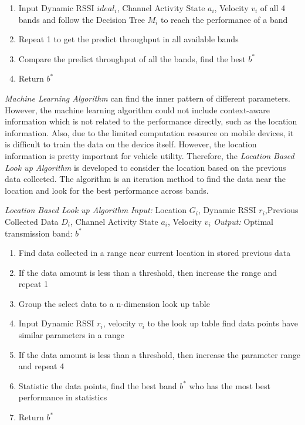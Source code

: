 \begin{enumerate}
\item Input Dynamic RSSI $ideal_i$, Channel Activity State $a_i$, Velocity $v_i$ of all 4 bands and follow the Decision Tree $M_i$ to reach the performance of a band
\item Repeat 1 to get the predict throughput in all available bands
\item Compare the predict throughput of all the bands, find the best $b^*$
\item Return $b^*$
\end{enumerate}

\emph{Machine Learning Algorithm} can find the inner pattern of different parameters. However, the machine learning algorithm could not include context-aware information which is not related to the performance directly, such as the location information. Also, due to the limited computation resource on mobile devices, it is difficult to train the data on the device itself. 
However, the location information is pretty important for vehicle utility.
Therefore, the \emph{Location Based Look up Algorithm} is developed to consider the location based on the previous data collected. The algorithm is an iteration method to find the data near the location and look for the best performance across bands.



\emph{Location Based Look up Algorithm}
\emph{Input:} Location $G_i$, Dynamic RSSI $r_i$,Previous Collected Data $D_i$, Channel Activity State $a_i$, Velocity $v_i$ 
\emph{Output:} Optimal transmission band: $b^*$

\begin{enumerate}
\item Find data collected in a range near current location in stored previous data
\item If the data amount is less than a threshold, then increase the range and repeat 1
\item Group the select data to a n-dimension look up table
\item Input Dynamic RSSI $r_i$, velocity $v_i$ to the look up table find data points have similar parameters in a range
\item If the data amount is less than a threshold, then increase the parameter range and repeat 4
\item Statistic the data points, find the best band $b^*$ who has the most best performance in statistics
\item Return $b^*$
\end{enumerate}


